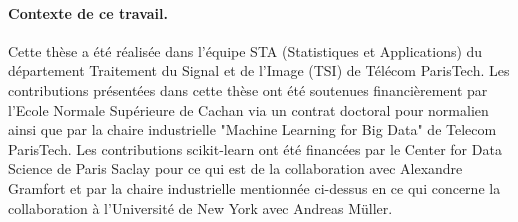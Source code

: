 

\paragraph{Contexte de ce travail.}
Cette thèse a été réalisée dans l'équipe STA (Statistiques et Applications) du département Traitement du Signal et de l'Image (TSI) de Télécom ParisTech. Les contributions présentées dans cette thèse ont été soutenues financièrement par l'Ecole Normale Supérieure de Cachan via un contrat doctoral pour normalien ainsi que par la chaire industrielle "Machine Learning for Big Data" de Telecom ParisTech. Les contributions scikit-learn ont été financées par le Center for Data Science de Paris Saclay pour ce qui est de la collaboration avec Alexandre Gramfort et par la chaire industrielle mentionnée ci-dessus en ce qui concerne la collaboration à l'Université de New York avec Andreas Müller.